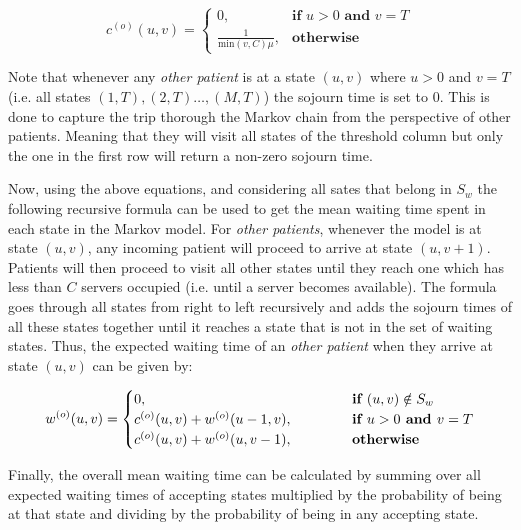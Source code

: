 \begin{equation} \label{eq:sojourn_others}
    c^{(o)}(u,v) = 
    \begin{cases}
        0, & \textbf{if } u > 0 \textbf{ and } v = T \\
        \frac{1}{\text{min}(v,C)\mu}, & \textbf{otherwise}
    \end{cases}
\end{equation}

Note that whenever any \textit{other patient} is at a state \((u,v)\) where \(u > 0\) 
and \(v = T\) (i.e. all states \((1,T), (2,T) \dots, (M,T)\)) the sojourn time is 
set to \(0\). 
This is done to capture the trip thorough the Markov chain from the perspective 
of other patients. 
Meaning that they will visit all states of the threshold column but only the one 
in the first row will return a non-zero sojourn time.

Now, using the above equations, and considering all sates that belong in \(S_w\) 
the following recursive formula can be used to get the mean waiting time spent in 
each state in the Markov model. 
For \textit{other patients}, whenever the model is at state \( (u,v) \), any incoming 
patient will proceed to arrive at state \( (u, v+1) \). 
Patients will then proceed to visit all other states until they reach one which 
has less than \(C\) servers occupied (i.e. until a server becomes available). 
The formula goes through all states from right to left recursively and adds the 
sojourn times of all these states together until it reaches a state that is not 
in the set of waiting states. 
Thus, the expected waiting time of an \textit{other patient} when they arrive at 
state \( (u,v) \) can be given by:

\begin{equation} \label{eq:waiting-time-at-each-state-other}
    w^{(o)}(u,v) = 
    \begin{cases} 
        0, \hspace{4.85cm} & \textbf{if } (u,v) \notin S_w \\
        c^{(o)}(u,v) + w^{(o)}(u-1, v), & \textbf{if } u > 0 \textbf{ and } v = T \\
        c^{(o)}(u,v) + w^{(o)}(u, v-1), & \textbf{otherwise}
    \end{cases}
\end{equation}

Finally, the overall mean waiting time can be calculated by summing over all expected 
waiting times of accepting states multiplied by the probability of being at that 
state and dividing by the probability of being in any accepting state.

